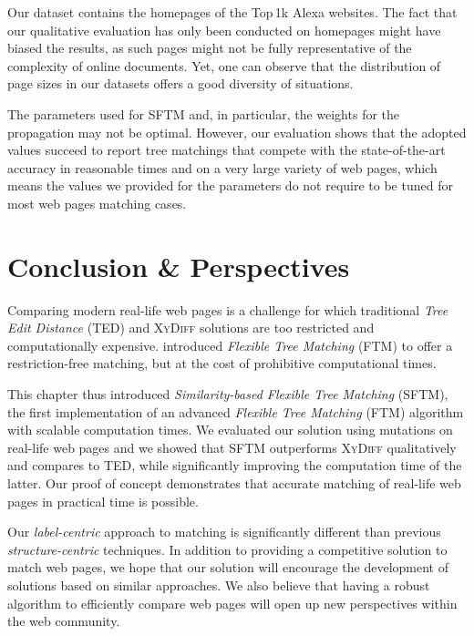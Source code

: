 Our dataset contains the homepages of the Top\,1k Alexa websites.
The fact that our qualitative evaluation has only been conducted on homepages might have biased the results, as such pages might not be fully representative of the complexity of online documents.
Yet, one can observe that the distribution of page sizes in our datasets offers a good diversity of situations.

The parameters used for SFTM and, in particular, the weights for the propagation may not be optimal.
However, our evaluation shows that the adopted values succeed to report tree matchings that compete with the state-of-the-art accuracy in reasonable times and on a very large variety of web pages, which means the values we provided for the parameters do not require to be tuned for most web pages matching cases.


\section{Conclusion \& Perspectives}\label{sec:conclusion}
Comparing modern real-life web pages is a challenge for which traditional \emph{Tree Edit Distance} (TED) and \textsc{XyDiff} solutions are too restricted and computationally expensive. 
\cite{Kumar2011_FTM} introduced \emph{Flexible Tree Matching} (FTM) to offer a restriction-free matching, but at the cost of prohibitive computational times.

This chapter thus introduced \emph{Similarity-based Flexible Tree Matching} (SFTM), the first implementation of an advanced \emph{Flexible Tree Matching} (FTM) algorithm with scalable computation times.
We evaluated our solution using mutations on real-life web pages and we showed that SFTM outperforms \textsc{XyDiff} qualitatively and compares to TED, while significantly improving the computation time of the latter.
Our proof of concept demonstrates that accurate matching of real-life web pages in practical time is possible.

Our \textit{label-centric} approach to matching is significantly different than previous \textit{structure-centric} techniques.
In addition to providing a competitive solution to match web pages, we hope that our solution will encourage the development of solutions based on similar approaches.
We also believe that having a robust algorithm to efficiently compare web pages will open up new perspectives within the web community.

